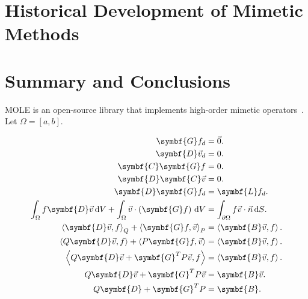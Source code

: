 \section{Historical Development of Mimetic Methods}

\section{Summary and Conclusions}

MOLE is an open-source library that implements high-order mimetic
operators~\cite{Corbino2024}.
Let $\Omega=\left[a,b\right]$.

\begin{align*}
	\symbf{G}f_{d}                           & =
	\vec{0}.                                     \\
	\symbf{D}\vec{v}_{d}                     & =
	0.                                           \\
	\symbf{C}\symbf{G}f                      & =
	0.                                           \\
	\symbf{D}\symbf{C}\vec{v}                & =
	0.                                           \\
	\symbf{D}\symbf{G}f_{d}                  & =
	\symbf{L}f_{d}.                              \\
	\int_{\Omega}
	f\symbf{D}\vec{v}\dl V+
	\int_{\Omega}
	\vec{v}\cdot\left(\symbf{G}f\right)\dl V & =
	\int_{\partial\Omega}
	f\vec{v}\cdot\vec{n}\dl S.                   \\
	{\left\langle
	\symbf{D}\vec{v},
	f
	\right\rangle}_{Q}+
	{\left\langle
	\symbf{G}f,
	\vec{v}
	\right\rangle}_{P}                       & =
	\left\langle
	\symbf{B}\vec{v},
	f
	\right\rangle.                               \\
	\left\langle
	Q\symbf{D}\vec{v},
	f
	\right\rangle+
	\left\langle
	P\symbf{G}f,
	\vec{v}
	\right\rangle                            & =
	\left\langle
	\symbf{B}\vec{v},
	f
	\right\rangle.                               \\
	\left\langle
	Q\symbf{D}\vec{v}+
	\symbf{G}^{T}P\vec{v},
	f
	\right\rangle                            & =
	\left\langle
	\symbf{B}\vec{v},
	f
	\right\rangle.                               \\
	Q\symbf{D}\vec{v}+
	\symbf{G}^{T}P\vec{v}                    & =
	\symbf{B}\vec{v}.                            \\
	Q\symbf{D}+
	\symbf{G}^{T}P                           & =
	\symbf{B}.
\end{align*}

